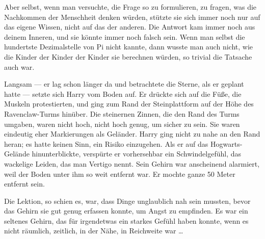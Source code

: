 Aber selbst, wenn man versuchte, die Frage so zu formulieren, zu fragen, was die Nachkommen der Menschheit denken würden, stützte sie sich immer noch nur auf das eigene Wissen, nicht auf das der anderen. Die Antwort kam immer noch aus deinem Inneren, und sie könnte immer noch falsch sein. Wenn man selbst die hundertste Dezimalstelle von Pi nicht kannte, dann wusste man auch nicht, wie die Kinder der Kinder der Kinder sie berechnen würden, so trivial die Tatsache auch war.

\later

Langsam — er lag schon länger da und betrachtete die Sterne, als er geplant hatte — setzte sich Harry vom Boden auf. Er drückte sich auf die Füße, die Muskeln protestierten, und ging zum Rand der Steinplattform auf der Höhe des Ravenclaw-Turms hinüber. Die steinernen Zinnen, die den Rand des Turms umgaben, waren nicht hoch, nicht hoch genug, um sicher zu sein. Sie waren eindeutig eher Markierungen als Geländer. Harry ging nicht zu nahe an den Rand heran; es hatte keinen Sinn, ein Risiko einzugehen. Als er auf das Hogwarts-Gelände hinunterblickte, verspürte er vorhersehbar ein Schwindelgefühl, das wackelige Leiden, das man Vertigo nennt. Sein Gehirn war anscheinend alarmiert, weil der Boden unter ihm so weit entfernt war. Er mochte ganze 50 Meter entfernt sein.

Die Lektion, so schien es, war, dass Dinge unglaublich nah sein mussten, bevor das Gehirn sie gut genug erfassen konnte, um Angst zu empfinden.
Es war ein seltenes Gehirn, das für irgendetwas ein starkes Gefühl haben konnte, wenn es nicht räumlich, zeitlich, in der Nähe, in Reichweite war …

